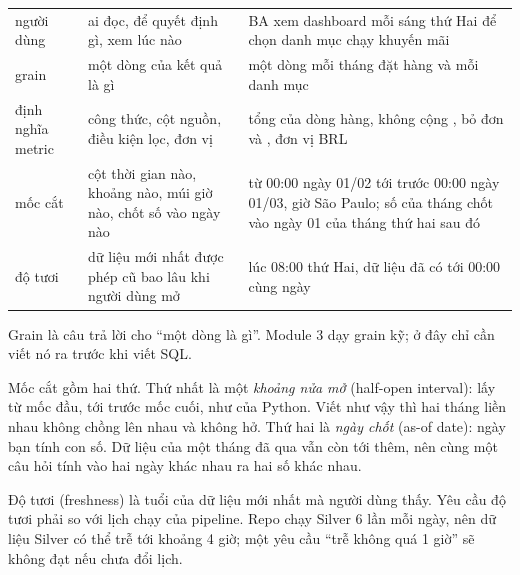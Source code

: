 \begin{xltabular}{\textwidth}{@{}P{2.6cm} P{4.2cm} L@{}}
\toprule
{} &  &  \\
\midrule
\endhead
\bottomrule
\endfoot
người dùng & ai đọc, để quyết định gì, xem lúc nào & BA xem dashboard mỗi sáng thứ Hai để chọn danh mục chạy khuyến mãi \\
grain & một dòng của kết quả là gì & một dòng mỗi tháng đặt hàng và mỗi danh mục \\
định nghĩa metric & công thức, cột nguồn, điều kiện lọc, đơn vị & tổng  của dòng hàng, không cộng , bỏ đơn  và , đơn vị BRL \\
mốc cắt & cột thời gian nào, khoảng nào, múi giờ nào, chốt số vào ngày nào &  từ 00:00 ngày 01/02 tới trước 00:00 ngày 01/03, giờ São Paulo; số của tháng chốt vào ngày 01 của tháng thứ hai sau đó \\
độ tươi & dữ liệu mới nhất được phép cũ bao lâu khi người dùng mở & lúc 08:00 thứ Hai, dữ liệu đã có tới 00:00 cùng ngày \\
\end{xltabular}

Grain là câu trả lời cho ``một dòng là gì''. Module 3 dạy grain kỹ; ở đây chỉ cần viết nó ra trước khi viết SQL.

Mốc cắt gồm hai thứ. Thứ nhất là một \textit{khoảng nửa mở} (half-open interval): lấy từ mốc đầu, tới trước mốc cuối, như  của Python. Viết như vậy thì hai tháng liền nhau không chồng lên nhau và không hở. Thứ hai là \textit{ngày chốt} (as-of date): ngày bạn tính con số. Dữ liệu của một tháng đã qua vẫn còn tới thêm, nên cùng một câu hỏi tính vào hai ngày khác nhau ra hai số khác nhau.

Độ tươi (freshness) là tuổi của dữ liệu mới nhất mà người dùng thấy. Yêu cầu độ tươi phải so với lịch chạy của pipeline. Repo chạy Silver 6 lần mỗi ngày, nên dữ liệu Silver có thể trễ tới khoảng 4 giờ; một yêu cầu ``trễ không quá 1 giờ'' sẽ không đạt nếu chưa đổi lịch.

